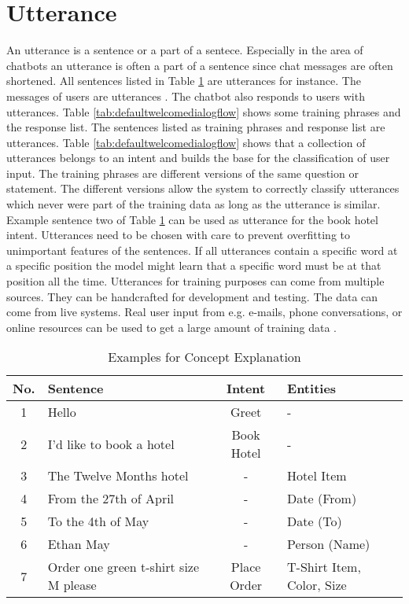 \section{Utterance} \label{sec:utterance}
An utterance is a sentence or a part of a sentece.
Especially in the area of chatbots an utterance is often a part of a sentence since 
chat messages are often shortened. 
All sentences listed in Table \ref{tab:example_sentences} are utterances for instance.
The messages of users are utterances \cite{singhbuilding, dutta2017developing}.
The chatbot also responds to users with utterances.
Table \ref{tab:defaultwelcomedialogflow} shows some training phrases and the response list.
The sentences listed as training phrases and response list are utterances. 
Table \ref{tab:defaultwelcomedialogflow} shows that a collection of utterances
belongs to an intent and builds the base for the classification of user input.
The training phrases are different versions of the same question or statement.
The different versions allow the system to correctly classify utterances which
never were part of the training data as long as the utterance is similar.
Example sentence two of Table \ref{tab:example_sentences} can be used 
as utterance for the book hotel intent.
Utterances need to be chosen with care to prevent overfitting to unimportant 
features of the sentences.
If all utterances contain a specific word at a specific position the model 
might learn that a specific word must be at that position all the time.
Utterances for training purposes can come from multiple sources.
They can be handcrafted for development and testing.
The data can come from live systems.
Real user input from e.g. e-mails, phone conversations, or online resources can be used to get a
 large amount of training data \cite{singhbuilding}.    


\begin{table}[H]
    \centering
    \begin{tabular}{ c | l | c | l }
        No. & Sentence & Intent & Entities \\ \hline \hline
        1 & Hello & Greet & - \\ \hline
        2 & I'd like to book a hotel & Book Hotel & - \\ \hline
        3 & The Twelve Months hotel & - & Hotel Item\\ \hline
        4 & From the 27th of April & - & Date (From)\\ \hline
        5 & To the 4th of May & - & Date (To)\\ \hline
        6 & Ethan May & - & Person (Name)\\ \hline
        7 & Order one green t-shirt size M please & Place Order & T-Shirt Item, Color, Size \\ \hline
    \end{tabular}
    \caption{Examples for Concept Explanation} \label{tab:example_sentences}
\end{table} \noindent

